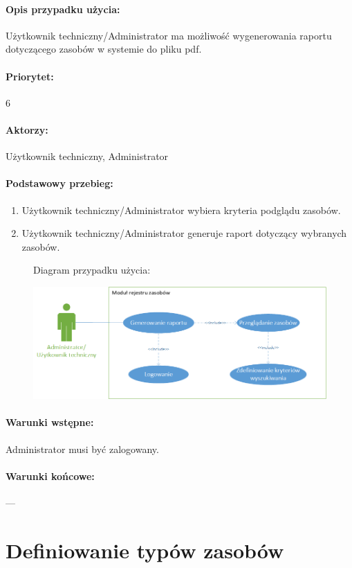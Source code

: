 \documentclass[11pt, a4paper, oneside]{report}
\begin{document}
\paragraph{Opis przypadku użycia:} 
Użytkownik techniczny/Administrator ma możliwość wygenerowania raportu dotyczącego zasobów w systemie do pliku pdf.
\paragraph{Priorytet:} 6
\paragraph{Aktorzy:} Użytkownik techniczny, Administrator
\paragraph{Podstawowy przebieg:}
\begin{enumerate}
\item Użytkownik techniczny/Administrator wybiera kryteria podglądu zasobów.
\item Użytkownik techniczny/Administrator generuje raport dotyczący wybranych zasobów. 
\end{enumerate}

\begin{figure}[H]
Diagram przypadku użycia:

\centering
\includegraphics[scale=0.8]{techniczny_i_admin_raporty.png}
\end{figure}

\paragraph{Warunki wstępne:} Administrator musi być zalogowany.
\paragraph{Warunki końcowe:} ---

\section{Definiowanie typów zasobów}
\end{document}
